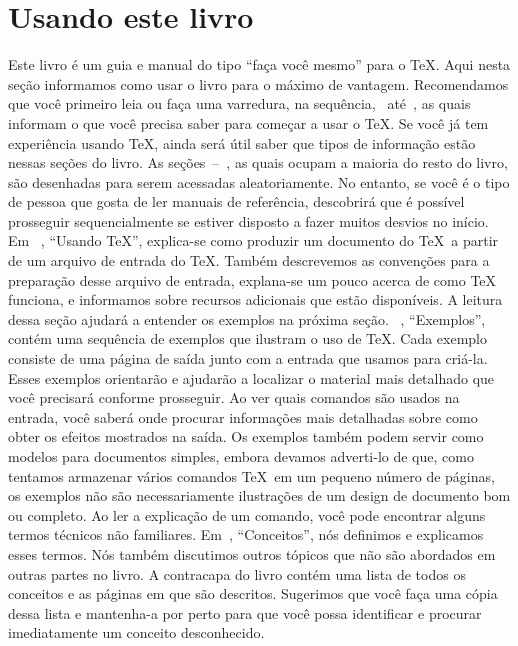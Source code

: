 

\chapter{Usando este livro}


Este livro \'e um guia e manual do tipo ``fa\c ca voc\^e mesmo'' para o 
\TeX.  Aqui nesta se\c c\~ao informamos como usar o livro para o 
m\'aximo de vantagem.  Recomendamos que voc\^e primeiro leia ou fa\c ca 
uma varredura, na sequ\^encia,~ 
at\'e~, as quais informam o que voc\^e precisa 
saber para come\c car a usar o \TeX.  Se voc\^e j\'a tem experi\^encia 
usando \TeX, ainda ser\'a \'util saber que tipos de informa\c c\~ao 
est\~ao nessas se\c c\~oes do livro.  As 
se\c c\~oes~--~, as quais ocupam a 
maioria do resto do livro, s\~ao desenhadas para serem acessadas 
aleatoriamente.  No entanto, se voc\^e \'e o tipo de pessoa que gosta de 
ler manuais de refer\^encia, descobrir\'a que \'e poss\'ivel prosseguir 
sequencialmente se estiver disposto a fazer muitos desvios no in\'icio.  
Em ~, ``Usando \TeX'', explica-se como produzir um 
documento do \TeX\ a partir de um arquivo de entrada do \TeX{}.  Tamb\'em 
descrevemos as conven\c c\~oes para a prepara\c c\~ao desse arquivo de entrada, 
explana-se um pouco acerca de como \TeX{} funciona, e informamos sobre 
recursos adicionais que est\~ao dispon\'iveis.  A leitura dessa se\c c\~ao 
ajudar\'a a entender os exemplos na pr\'oxima se\c c\~ao.  ~, 
``Exemplos'', cont\'em uma sequ\^encia de exemplos que ilustram o uso de 
\TeX.  Cada exemplo consiste de uma p\'agina de sa\'ida junto com a entrada 
que usamos para cri\'a-la.  Esses exemplos orientar\~ao e ajudar\~ao a 
localizar o material mais detalhado que voc\^e precisar\'a conforme 
prosseguir.  Ao ver quais comandos s\~ao usados na entrada, voc\^e saber\'a 
onde procurar informa\c c\~oes mais detalhadas sobre como obter os efeitos 
mostrados na sa\'ida.  Os exemplos tamb\'em podem servir como modelos para 
documentos simples, embora devamos adverti-lo de que, como tentamos 
armazenar v\'arios comandos \TeX\ em um pequeno n\'umero de p\'aginas, os 
exemplos n\~ao s\~ao necessariamente ilustra\c c\~oes de um design de documento 
bom ou completo.  Ao ler a explica\c c\~ao de um comando, voc\^e pode encontrar 
alguns termos t\'ecnicos n\~ao familiares.  Em~, 
``Conceitos'', n\'os definimos e explicamos esses termos.  N\'os tamb\'em 
discutimos outros t\'opicos que n\~ao s\~ao abordados em outras partes no 
livro.  A contracapa do livro cont\'em uma lista de todos os conceitos e 
as p\'aginas em que s\~ao descritos.  Sugerimos que voc\^e fa\c ca uma c\'opia 
dessa lista e mantenha-a por perto para que voc\^e possa identificar e 
procurar imediatamente um conceito desconhecido.

